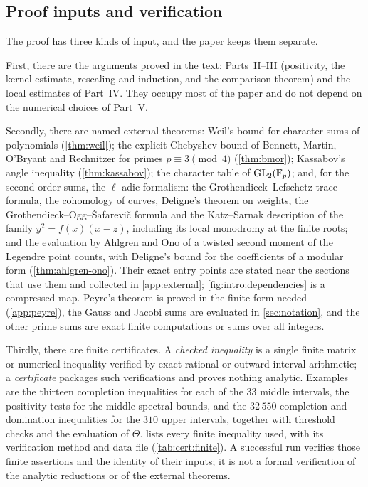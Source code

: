 \subsection{Proof inputs and verification}\label{subsec:intro:status}

The proof has three kinds of input, and the paper keeps them separate.

First, there are the arguments proved in the text: Parts~II--III
(positivity, the kernel estimate, rescaling and induction, and the
comparison theorem) and the local estimates of Part~IV. They occupy
most of the paper and do not depend on the numerical choices of
Part~V.

Secondly, there are named external theorems: Weil's bound for character
sums of polynomials (\cref{thm:weil}); the explicit Chebyshev bound of
Bennett, Martin, O'Bryant and Rechnitzer \cite{BMOR18} for primes
$p\equiv3\pmod4$ (\cref{thm:bmor}); Kassabov's angle inequality
(\cref{thm:kassabov}); the character table of $\mathrm{GL}_2(\mathbb F_p)$; and,
for the second-order sums, the $\ell$-adic formalism: the
Grothendieck--Lefschetz trace formula, the cohomology of curves,
Deligne's theorem on weights, the Grothendieck--Ogg--\v Safarevi\v c
formula and the Katz--Sarnak description of the family $y^2=f(x)(x-z)$,
including its local monodromy at the finite roots; and the evaluation by
Ahlgren and Ono of a twisted second moment of the Legendre point counts,
with Deligne's bound for the coefficients of a modular form
(\cref{thm:ahlgren-ono}). Their exact entry
points are stated near the sections that use them and collected in
\cref{app:external}; \cref{fig:intro:dependencies} is a compressed map.
Peyre's theorem is proved in the finite form needed (\cref{app:peyre}),
the Gauss and Jacobi sums are evaluated in \cref{sec:notation}, and the
other prime sums are exact finite computations or sums over all integers.

Thirdly, there are finite certificates. A \emph{checked inequality}
is a single finite matrix or numerical inequality verified by exact
rational or outward-interval arithmetic; a \emph{certificate}
packages such verifications and proves nothing analytic. Examples
are the thirteen completion inequalities for each of the $33$ middle
intervals, the positivity tests for the middle spectral bounds, and
the $32\,550$ completion and domination inequalities for the $310$
upper intervals, together with threshold checks and the evaluation
of $\Theta$.  lists every finite inequality
used, with its verification method and data file
(\cref{tab:cert:finite}). A successful run verifies those finite
assertions and the identity of their inputs; it is not a formal
verification of the analytic reductions or of the external theorems.

